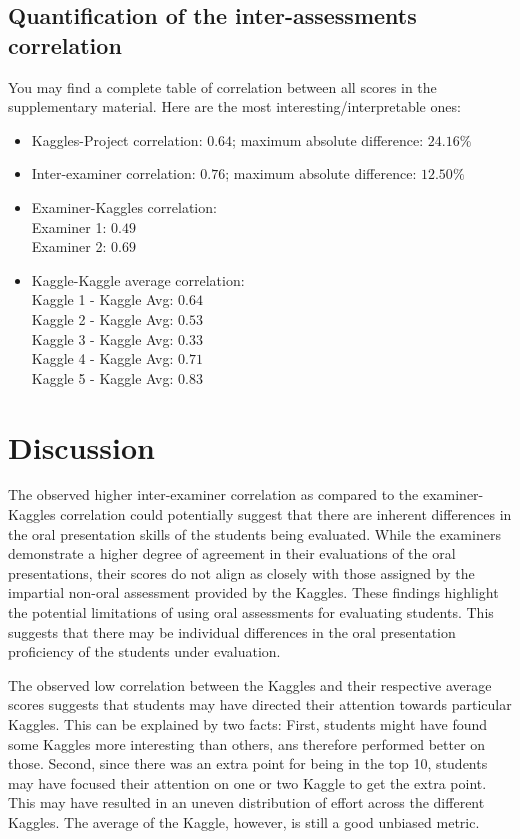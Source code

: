\documentclass[a4paper]{article}
\begin{document}
	\subsection{Quantification of the inter-assessments correlation}
	You may find a complete table of correlation between all scores in the supplementary material.
	Here are the most interesting/interpretable ones:
	\begin{itemize}
		\item Kaggles-Project correlation: $0.64$; maximum absolute difference: $24.16\%$
		\item Inter-examiner correlation: $0.76$; maximum absolute difference: $12.50\%$
		\item Examiner-Kaggles correlation:\\
		Examiner 1: $0.49$\\
		Examiner 2: $0.69$
		\item Kaggle-Kaggle average correlation:\\
		Kaggle 1 - Kaggle Avg: $0.64$\\
		Kaggle 2 - Kaggle Avg: $0.53$\\
		Kaggle 3 - Kaggle Avg: $0.33$\\
		Kaggle 4 - Kaggle Avg: $0.71$\\
		Kaggle 5 - Kaggle Avg: $0.83$
	\end{itemize}
	
	
	\section{Discussion}
	The observed higher inter-examiner correlation as compared to the examiner-Kaggles correlation could potentially suggest that there are inherent differences in the oral presentation skills of the students being evaluated.
	While the examiners demonstrate a higher degree of agreement in their evaluations of the oral presentations, their scores do not align as closely with those assigned by the impartial non-oral assessment provided by the Kaggles.
	These findings highlight the potential limitations of using oral assessments for evaluating students.
	This suggests that there may be individual differences in the oral presentation proficiency of the students under evaluation.
	
	The observed low correlation between the Kaggles and their respective average scores suggests that students may have directed their attention towards particular Kaggles.
	This can be explained by two facts:
	First, students might have found some Kaggles more interesting than others, ans therefore performed better on those.
	Second, since there was an extra point for being in the top 10, students may have focused their attention on one or two Kaggle to get the extra point.
	This may have resulted in an uneven distribution of effort across the different Kaggles.
	The average of the Kaggle, however, is still a good unbiased metric.
	
\end{document}
